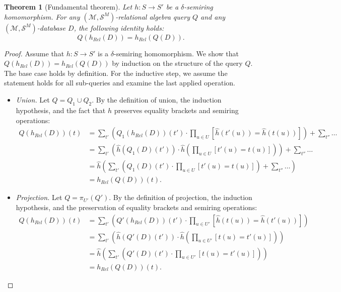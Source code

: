 \documentclass[oneside, 11pt]{amsbook}
\theoremstyle{plain}
\newtheorem{thm}{Theorem}[section]
\theoremstyle{definition}
\theoremstyle{remark}
\begin{document}
\begin{thm}[Fundamental theorem]
    \label{thm:fundamentalarbitraryaggregation}
    Let $h: S \to S'$ be a $\delta$-semiring homomorphism. For any $(\mathcal{M}, \mathcal{S}^M)$-relational algebra query $Q$ and any $(\mathcal{M}, \mathcal{S}^M)$-database $D$, the following identity holds:
    \[
        Q(h_{Rel}(D)) = h_{Rel}(Q(D)).
    \]
\end{thm}
\begin{proof}
    Assume that $h : S \to S'$ is a $\delta$-semiring homomorphism. We show that $Q(h_{Rel}(D)) = h_{Rel}(Q(D))$ by induction on the structure of the query $Q$. The base case holds by definition. For the inductive step, we assume the statement holds for all sub-queries and examine the last applied operation.
    \begin{itemize}
        \item \emph{Union.}
              Let $Q = Q_1 \cup Q_2$. By the definition of union, the induction hypothesis, and the fact that $\widehat{h}$ preserves equality brackets and semiring operations:
              \begin{align*}
                  Q(h_{Rel}(D))(t) & = \sum_{t'} \left( Q_1(h_{Rel}(D))(t') \cdot \prod_{u \in U} [\widehat{h}(t'(u)) = \widehat{h}(t(u))] \right) + \sum_{t''} \dots     \\
                                   & = \sum_{t'} \left( \widehat{h}(Q_1(D)(t')) \cdot \widehat{h}\!\left(\prod_{u \in U} [t'(u) = t(u)]\right) \right) + \sum_{t''} \dots \\
                                   & = \widehat{h} \left( \sum_{t'} \left( Q_1(D)(t') \cdot \prod_{u \in U} [t'(u) = t(u)] \right) + \sum_{t''} \dots \right)             \\
                                   & = h_{Rel}(Q(D))(t).
              \end{align*}

        \item \emph{Projection.}
              Let $Q = \pi_{U'}(Q')$. By the definition of projection, the induction hypothesis, and the preservation of equality brackets and semiring operations:
              \begin{align*}
                  Q(h_{Rel}(D))(t) & = \sum_{t'} \left( Q'(h_{Rel}(D))(t') \cdot \prod_{u \in U'} [\widehat{h}(t(u)) = \widehat{h}(t'(u))] \right)     \\
                                   & = \sum_{t'} \left( \widehat{h}(Q'(D)(t')) \cdot \widehat{h}\!\left(\prod_{u \in U'} [t(u) = t'(u)]\right) \right) \\
                                   & = \widehat{h} \left( \sum_{t'} \left( Q'(D)(t') \cdot \prod_{u \in U'} [t(u) = t'(u)] \right) \right)             \\
                                   & = h_{Rel}(Q(D))(t).
              \end{align*}


\end{itemize}
\end{proof}
\end{document}
